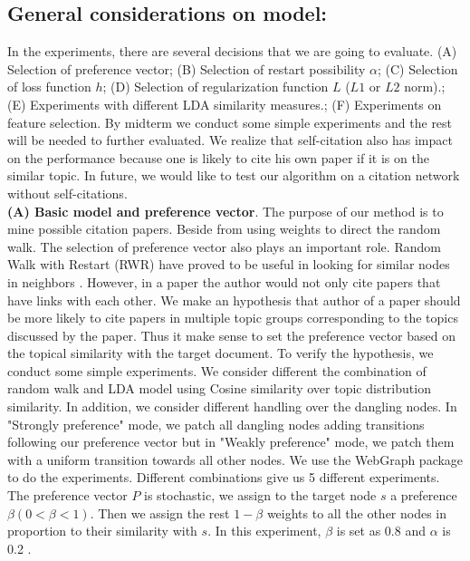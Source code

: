 \documentclass{article} %
\begin{document}
\subsection{General considerations on model:} 
In the experiments, there are several decisions that we are going to evaluate. (A) Selection of preference vector; (B) Selection of restart possibility $\alpha$; (C) Selection of loss function $h$;  (D) Selection of regularization function $L$ ($L1$ or $L2$ norm).; (E) Experiments with different LDA similarity measures.; (F) Experiments on feature selection. By midterm we conduct some simple experiments and the rest will be needed to further evaluated. We realize that self-citation also has impact on the performance because one is likely to cite his own paper if it is on the similar topic. In future, we would like to test our algorithm on a citation network without self-citations.\\
\textbf{(A) Basic model and preference vector}. 
The purpose of our method is to mine possible citation papers. Beside from using weights to direct the random walk. The selection of preference vector also plays an important role. Random Walk with Restart (RWR) have proved to be useful in looking for similar nodes in neighbors  \cite{Backstrom:2011:SRW:1935826.1935914,Tong2006}. However, in a paper the author would not only cite papers that have links with each other. We make an hypothesis that author of a paper should be more likely to cite papers in multiple topic groups corresponding to the topics discussed by the paper. Thus it make sense to set the preference vector based on the topical similarity with the target document. To verify the hypothesis, we conduct some simple experiments. We consider different the combination of random walk and LDA model using Cosine similarity over topic distribution similarity. In addition, we consider different handling over the dangling nodes. In "Strongly preference" mode, we patch all dangling nodes adding transitions following our preference vector but in "Weakly preference" mode, we patch them with a uniform transition towards all other nodes. We use the WebGraph\cite{Boldi2004} package to do the experiments. Different combinations give us 5 different experiments.\\
The preference vector $P$ is stochastic, we assign to the target node $s$ a preference $\beta (0< \beta <1)$. Then we assign the rest $1-\beta$ weights to all the other nodes in proportion to their similarity with $s$. In this experiment, $\beta$ is set as 0.8 and $\alpha$ is 0.2 .\\
\end{document}
